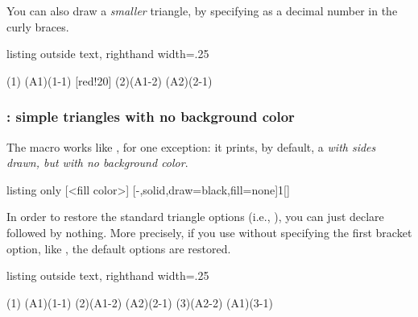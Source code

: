 You can also draw a \emph{smaller} triangle, by specifying  as a decimal number in the curly braces.

\begin{tcblisting}{listing outside text, righthand width=.25\linewidth}
\begin{istgame}[font=\scriptsize]
\cntmdistance*{10mm}{20mm}
\istrootcntm(1)       \istb        \endist
\istroot(A1)(1-1)     \istb \istb  \endist
{}[red!20]
\istrootcntm(2)(A1-2) \istb \istbm \endist
\istroot(A2)(2-1)     \istb \istb  \endist
\end{istgame} 
\end{tcblisting}


\subsubsection{\protect\cmd{\cntmpreset*}: simple triangles with no background color}
\label{ssec:cntmpreset*}

The macro \icmd{\cntmpreset*} works like \cmd{\cntmpreset}, for one exception: it prints, by default, a \emph{ with sides drawn, but with no background color}.

\begin{tcblisting}{listing only}
  [<fill color>]
  [-,solid,draw=black,fill=none]{1}[]
\end{tcblisting}

\remark
In order to restore the standard triangle options (i.e., \xw{[-,draw=none,black!25]}), you can just declare \cmd{\cntmpreset} followed by nothing. More precisely, if you use \cmd{\cntmpreset} without specifying the first bracket option, like , the default options are restored.

\begin{tcblisting}{listing outside text, righthand width=.25\linewidth}
\begin{istgame}[font=\scriptsize]
\cntmdistance*{10mm}{20mm}
\cntmpreset*
\istrootcntm(1)
  \istb        \endist
\istroot(A1)(1-1)
  \istb \istb  \endist
\cntmpreset*[fill=blue!20]
\istrootcntm(2)(A1-2)
  \istb        \endist
\istroot(A2)(2-1)
  \istb \istb  \endist
\cntmpreset %
\istrootcntm(3)(A2-2)
  \istb \istbm \endist
\istroot(A1)(3-1)
  \istb \istb  \endist
\end{istgame}
\end{tcblisting}


